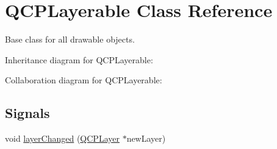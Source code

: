 \hypertarget{classQCPLayerable}{}\section{Q\+C\+P\+Layerable Class Reference}
\label{classQCPLayerable}


Base class for all drawable objects.  




Inheritance diagram for Q\+C\+P\+Layerable\+:


Collaboration diagram for Q\+C\+P\+Layerable\+:
\subsection*{Signals}
\begin{DoxyCompactItemize}
\item 
void \hyperlink{classQCPLayerable_abbf8657cedea73ac1c3499b521c90eba}{layer\+Changed} (\hyperlink{classQCPLayer}{Q\+C\+P\+Layer} $\ast$new\+Layer)
\end{DoxyCompactItemize}
